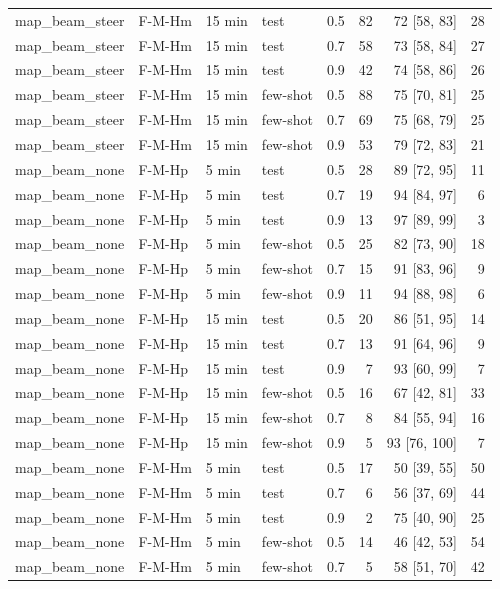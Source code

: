 \begin{table}[t]
\begin{tabular}{llllrrrr}
map\_beam\_steer & F-M-Hm & 15 min & test & 0.5 & 82 & 72 [58, 83] & 28 \\
map\_beam\_steer & F-M-Hm & 15 min & test & 0.7 & 58 & 73 [58, 84] & 27 \\
map\_beam\_steer & F-M-Hm & 15 min & test & 0.9 & 42 & 74 [58, 86] & 26 \\
map\_beam\_steer & F-M-Hm & 15 min & few-shot & 0.5 & 88 & 75 [70, 81] & 25 \\
map\_beam\_steer & F-M-Hm & 15 min & few-shot & 0.7 & 69 & 75 [68, 79] & 25 \\
map\_beam\_steer & F-M-Hm & 15 min & few-shot & 0.9 & 53 & 79 [72, 83] & 21 \\
map\_beam\_none & F-M-Hp & 5 min & test & 0.5 & 28 & 89 [72, 95] & 11 \\
map\_beam\_none & F-M-Hp & 5 min & test & 0.7 & 19 & 94 [84, 97] & 6 \\
map\_beam\_none & F-M-Hp & 5 min & test & 0.9 & 13 & 97 [89, 99] & 3 \\
map\_beam\_none & F-M-Hp & 5 min & few-shot & 0.5 & 25 & 82 [73, 90] & 18 \\
map\_beam\_none & F-M-Hp & 5 min & few-shot & 0.7 & 15 & 91 [83, 96] & 9 \\
map\_beam\_none & F-M-Hp & 5 min & few-shot & 0.9 & 11 & 94 [88, 98] & 6 \\
map\_beam\_none & F-M-Hp & 15 min & test & 0.5 & 20 & 86 [51, 95] & 14 \\
map\_beam\_none & F-M-Hp & 15 min & test & 0.7 & 13 & 91 [64, 96] & 9 \\
map\_beam\_none & F-M-Hp & 15 min & test & 0.9 & 7 & 93 [60, 99] & 7 \\
map\_beam\_none & F-M-Hp & 15 min & few-shot & 0.5 & 16 & 67 [42, 81] & 33 \\
map\_beam\_none & F-M-Hp & 15 min & few-shot & 0.7 & 8 & 84 [55, 94] & 16 \\
map\_beam\_none & F-M-Hp & 15 min & few-shot & 0.9 & 5 & 93 [76, 100] & 7 \\
map\_beam\_none & F-M-Hm & 5 min & test & 0.5 & 17 & 50 [39, 55] & 50 \\
map\_beam\_none & F-M-Hm & 5 min & test & 0.7 & 6 & 56 [37, 69] & 44 \\
map\_beam\_none & F-M-Hm & 5 min & test & 0.9 & 2 & 75 [40, 90] & 25 \\
map\_beam\_none & F-M-Hm & 5 min & few-shot & 0.5 & 14 & 46 [42, 53] & 54 \\
map\_beam\_none & F-M-Hm & 5 min & few-shot & 0.7 & 5 & 58 [51, 70] & 42 \\

\end{tabular}
\end{table}
